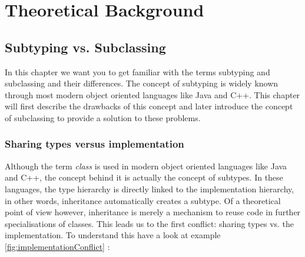 
\part{Theoretical Background}
\chapter{Subtyping vs. Subclassing}
In this chapter we want you to get familiar with the terms subtyping
and subclassing and their differences. The concept of subtyping is widely
known through most modern object oriented languages like Java and C++. This
chapter will first describe the drawbacks of this concept and later introduce
the concept of subclassing to provide a solution to these problems. \\

\section{Sharing types versus implementation}
Although the term \emph{class} is used in modern object oriented languages
like Java and C++, the concept behind it is actually the concept of subtypes.
In these languages, the type hierarchy is directly linked
to the implementation hierarchy, in other words, inheritance automatically 
creates a subtype. Of a theoretical point of view however, inheritance is merely
a mechanism to reuse code in further specialisations of classes. This leads us
to the first conflict: sharing types vs. the implementation. To understand this
have a look at example \ref{fig:implementationConflict} \cite{simons_theory_2003-4}: %

